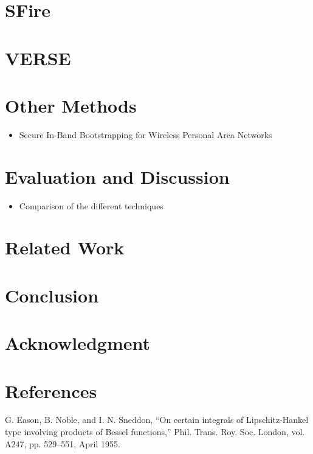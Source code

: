 \documentclass[conference]{IEEEtran}
\begin{document}
\section{SFire}



\section{VERSE}

\section{Other Methods}
\begin{itemize}
    \item Secure In-Band Bootstrapping for Wireless Personal Area Networks 
\end{itemize}
\section{Evaluation and Discussion}

\begin{itemize}
    \item Comparison of the different techniques
\end{itemize}

\section{Related Work}

\section{Conclusion}

\section*{Acknowledgment}

\section*{References}


\begin{thebibliography}{00}
 G. Eason, B. Noble, and I. N. Sneddon, ``On certain integrals of Lipschitz-Hankel type involving products of Bessel functions,'' Phil. Trans. Roy. Soc. London, vol. A247, pp. 529--551, April 1955.
\end{thebibliography}
\end{document}
